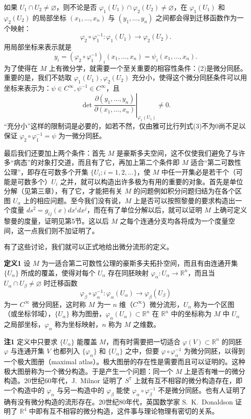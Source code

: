 如果 $U_1\cap U_2\ne\varnothing$，则不论是否 $\varphi_1(U_1)\cap\varphi_2(U_2)\ne\varnothing$，在 $\varphi_1(U_1)$ 和 $\varphi_2(U_2)$ 的局部坐标 $(x_1,\ldots,x_n)$ 与 $(y_1,\ldots,y_n)$ 之间都会得到迁移函数作为一个映射：
\[
 \varphi_2\circ\varphi_1^{-1}:\varphi_1(U_1)\longrightarrow\varphi_2(U_2).
\]
用局部坐标来表示就是
\begin{equation}
 y_i=(\varphi_2\circ\varphi_1^{-1})_i(x_1,\ldots,x_n)
 =\psi_i(x_1,\ldots,x_n).
 \tag{2}
\end{equation}
为了使得在 $M$ 上有微分学，就需要一个至关重要的相容性条件：(2)是微分同胚。重要的是，我们不妨取 $\varphi_1(U_1),\varphi_2(U_2)$ 充分小，使得这个微分同胚条件可以用坐标来表示为：$\psi\in C^\infty,\psi^{-1}\in C^\infty$，且
\begin{equation}
 \left.\det\frac{\partial(y_1,\ldots,y_n)}{\partial(x_1,\ldots,x_n)}\right|_{\varphi_1(U_1)}\ne0.
 \tag{3}
\end{equation}
“充分小”这样的限制词是必要的，如若不然，仅由雅可比行列式(3)不为0尚不足以保证 $\varphi_2\circ\varphi_1^{-1}=\psi$ 为一微分同胚。

最后我们还要加上两个条件：首先 $M$ 是豪斯多夫空间，这不仅使我们避免了与许多“病态”的对象打交道，而且有了它，再加上第二个条件即 $M$ 适合“第二可数性公理”，即存在可数多个开集 $\{U_i;i=1,2,\ldots\}$，使 $M$ 中任一开集必是若干个（可能是可数多个）$U_i$ 之并，就可以构造出许多极为有用的重要的对象。首先是单位分解（见第三章），有了它，才能把有关 $M$ 的问题例如积分问题归结为在各个区图 $U_\alpha$ 上的相应问题。至今我们没有说，$M$ 上是否可以按照黎曼的要求构造出一个度量 $ds^2=g_{ij}(x)dx^i dx^j$，而在有了单位分解以后，就可以证明 $M$ 上确可定义黎曼的度量，证明见第5节。这以后 $M$ 之每个连通分支均各将成为一个度量空间，这一点我们则不加证明了。

有了这些讨论，我们就可以正式地给出微分流形的定义。

\noindent\textbf{定义1}\quad
设 $M$ 为一适合第二可数性公理的豪斯多夫拓扑空间，而且有由连通开集 $\{U_\alpha\}$ 所成的覆盖，使得对每个 $U_\alpha$ 存在同胚映射 $\varphi_\alpha:U_\alpha\to\mathbb R^n$，而且当 $U_\alpha\cap U_\beta\ne\varnothing$ 时迁移函数
\[
 \varphi_\beta\circ\varphi_\alpha^{-1}:\varphi_\alpha(U_\alpha)\longrightarrow\varphi_\beta(U_\beta)
\]
为一 $C^\infty$ 微分同胚，这时称 $M$ 为一 $n$ 维（$C^\infty$）微分流形，$U_\alpha$ 称为一个区图（或坐标邻域），$\{U_\alpha\}$ 称为图册，$\varphi_\alpha(U_\alpha)\subset\mathbb R^n$ 在 $\mathbb R^n$ 中的坐标称为 $M$ 中 $U_\alpha$ 之局部坐标，$\varphi_\alpha$ 称为坐标映射，$n$ 称为 $M$ 之维数。

\noindent\textbf{注1}\quad
定义中只要求 $\{U_\alpha\}$ 能覆盖 $M$，而有时需要把一切适合 $\varphi(V)\subset\mathbb R^n$ 的同胚 $\varphi$ 与连通开集 $V$ 也都列入 $\{\varphi_\alpha\}$ 和 $\{U_\alpha\}$ 之中，但要 $\varphi\circ\varphi_\alpha^{-1}$ 为微分同胚，以得到一个极大图册（maximal atlas）。极大图册的存在性是需要而且可以证明的。这种极大图册称为一个微分构造。于是产生一个问题：同一个 $M$ 上是否有唯一的微分构造。20世纪60年代，J.~Milnor 证明了 $S^7$ 上就有互不相容的微分构造存在，即一个构造中的 $\varphi_\alpha$ 与另一构造中的 $\varphi_\beta$ 能使 $\varphi_\alpha\circ\varphi_\beta^{-1}$ 不是微分同胚。也有人证明了确有没有微分构造的流形存在。20世纪80年代，英国数学家 S.~K.~Donaldson 证明了 $\mathbb R^4$ 中即有互不相容的微分构造，这件事与理论物理有密切的关系。

